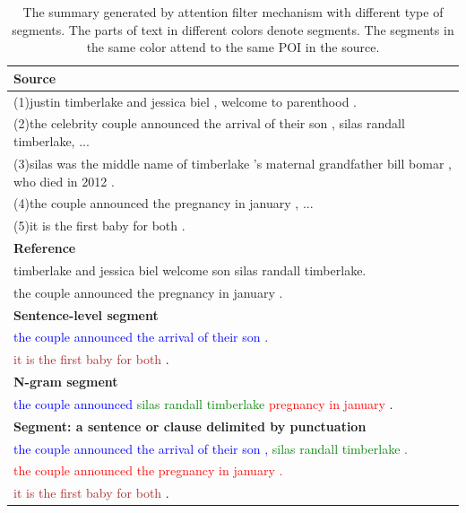 \begin{table}[th!]
\begin{center}
\caption{The summary generated by attention filter mechanism with different type of segments. 
The parts of text in different colors denote segments. The segments in the same color attend to the same POI in the source.}
\begin{tabular}{|l|}%
\hline 
\textbf{Source} \\
\hline 
(1)justin timberlake and jessica biel , welcome to parenthood . \\
(2)the celebrity couple announced the arrival of their son , silas randall timberlake, ... \\
(3)silas was the middle name of timberlake ’s maternal grandfather bill bomar , who died in 2012 .\\
(4)the couple announced the pregnancy in january , ... \\
(5)it is the first baby for both .  \\
\hline 
\textbf{Reference} \\
\hline 
timberlake and jessica biel welcome son silas randall timberlake. \\
the couple announced the pregnancy in january . \\
\hline 
\textbf{Sentence-level segment} \\
\hline \textcolor{blue}{the couple announced the arrival of their son .} \\
	   \textcolor{brown}{it is the first baby for both} \textcolor{black}{.}  \\
\hline 
\textbf{N-gram segment} \\
\hline \textcolor{blue}{the couple announced} \textcolor{green}{silas randall timberlake} \textcolor{red}{pregnancy in january }  \textcolor{black}{.}\\
\hline
\textbf{Segment: a sentence or clause delimited by punctuation} \\
\hline \textcolor{blue}{the couple announced the arrival of their son ,} \textcolor{green}{silas randall timberlake .} \\
       \textcolor{red}{the couple announced the pregnancy in january .} \\ 
	   \textcolor{brown}{it is the first baby for both} \textcolor{black}{.} \\
\hline 
\end{tabular}
\label{tab:punct}
\end{center}
\end{table}

